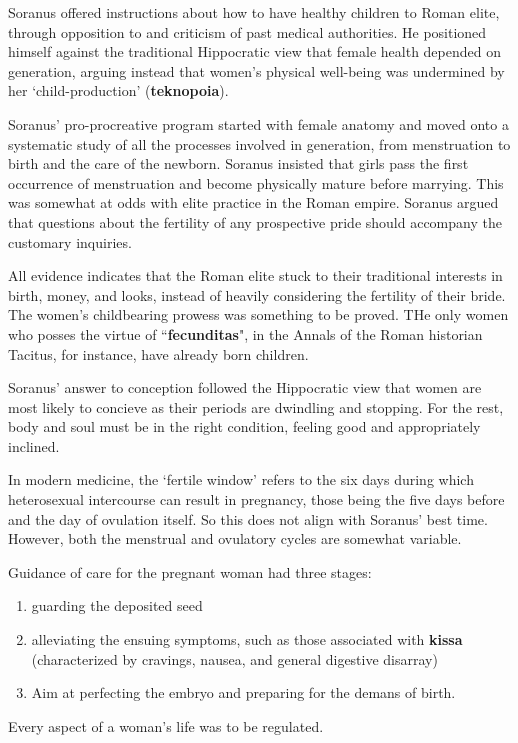 \begin{rmk}
    Soranus offered instructions about how to have healthy children to Roman elite, through opposition to and criticism of past medical authorities. He positioned himself against the traditional Hippocratic view that female health depended on generation, arguing instead that women's physical well-being was undermined by her `child-production' (\textbf{teknopoia}).
\end{rmk}

Soranus' pro-procreative program started with female anatomy and moved onto a systematic study of all the processes involved in generation, from menstruation to birth and the care of the newborn. Soranus insisted that girls pass the first occurrence of menstruation and become physically mature before marrying. This was somewhat at odds with elite practice in the Roman empire. Soranus argued that questions about the fertility of any prospective pride should accompany the customary inquiries.

\begin{nte}
    All evidence indicates that the Roman elite stuck to their traditional interests in birth, money, and looks, instead of heavily considering the fertility of their bride. The women's childbearing prowess was something to be proved. THe only women who posses the virtue of ``\textbf{fecunditas}", in the Annals of the Roman historian Tacitus, for instance, have already born children.
\end{nte}

Soranus' answer to conception followed the Hippocratic view that women are most likely to concieve as their periods are dwindling and stopping. For the rest, body and soul must be in the right condition, feeling good and appropriately inclined.

\begin{rmk}
    In modern medicine, the `fertile window' refers to the six days during which heterosexual intercourse can result in pregnancy, those being the five days before and the day of ovulation itself. So this does not align with Soranus' best time. However, both the menstrual and ovulatory cycles are somewhat variable.
\end{rmk}

Guidance of care for the pregnant woman had three stages: 
\begin{enumerate}
    \item guarding the deposited seed
    \item alleviating the ensuing symptoms, such as those associated with \textbf{kissa} (characterized by cravings, nausea, and general digestive disarray)
    \item Aim at perfecting the embryo and preparing for the demans of birth.
\end{enumerate}
Every aspect of a woman's life was to be regulated.



